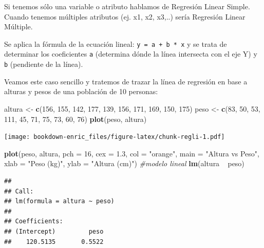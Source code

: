 \documentclass[]{book}
\newenvironment{Shaded}{\begin{snugshade}}{\end{snugshade}}
\newcommand{\KeywordTok}[1]{\textcolor[rgb]{0.13,0.29,0.53}{\textbf{{#1}}}}
\newcommand{\DataTypeTok}[1]{\textcolor[rgb]{0.13,0.29,0.53}{{#1}}}
\newcommand{\DecValTok}[1]{\textcolor[rgb]{0.00,0.00,0.81}{{#1}}}
\newcommand{\FloatTok}[1]{\textcolor[rgb]{0.00,0.00,0.81}{{#1}}}
\newcommand{\StringTok}[1]{\textcolor[rgb]{0.31,0.60,0.02}{{#1}}}
\newcommand{\CommentTok}[1]{\textcolor[rgb]{0.56,0.35,0.01}{\textit{{#1}}}}
\newcommand{\NormalTok}[1]{{#1}}
\theoremstyle{definition}
\theoremstyle{definition}
\theoremstyle{remark}
\begin{document}
Si tenemos sólo una variable o atributo hablamos de Regresión Linear
Simple. Cuando tenemos múltiples atributos (ej. x1, x2, x3,..) sería
Regresión Linear Múltiple.

Se aplica la fórmula de la ecuación lineal: \texttt{y\ =\ a\ +\ b\ *\ x}
y se trata de determinar los coeficientes \texttt{a} (determina dónde la
línea intersecta con el eje Y) y \texttt{b} (pendiente de la línea).

Veamos este caso sencillo y tratemos de trazar la línea de regresión en
base a alturas y pesos de una población de 10 personas:

\begin{Shaded}
\begin{Highlighting}[]
\NormalTok{altura <-}\StringTok{ }\KeywordTok{c}\NormalTok{(}\DecValTok{156}\NormalTok{, }\DecValTok{155}\NormalTok{, }\DecValTok{142}\NormalTok{, }\DecValTok{177}\NormalTok{, }\DecValTok{139}\NormalTok{, }\DecValTok{156}\NormalTok{, }\DecValTok{171}\NormalTok{, }\DecValTok{169}\NormalTok{, }\DecValTok{150}\NormalTok{, }\DecValTok{175}\NormalTok{)}
\NormalTok{peso <-}\StringTok{ }\KeywordTok{c}\NormalTok{(}\DecValTok{83}\NormalTok{, }\DecValTok{50}\NormalTok{, }\DecValTok{53}\NormalTok{, }\DecValTok{111}\NormalTok{, }\DecValTok{45}\NormalTok{, }\DecValTok{71}\NormalTok{, }\DecValTok{75}\NormalTok{, }\DecValTok{73}\NormalTok{, }\DecValTok{60}\NormalTok{, }\DecValTok{76}\NormalTok{)}
\KeywordTok{plot}\NormalTok{(peso, altura)}
\end{Highlighting}
\end{Shaded}

\texttt{[image: bookdown-enric\_files/figure-latex/chunk-regli-1.pdf]}

\begin{Shaded}
\begin{Highlighting}[]
\KeywordTok{plot}\NormalTok{(peso, altura, }\DataTypeTok{pch =} \DecValTok{16}\NormalTok{, }\DataTypeTok{cex =} \FloatTok{1.3}\NormalTok{, }\DataTypeTok{col =} \StringTok{"orange"}\NormalTok{, }
     \DataTypeTok{main =} \StringTok{"Altura vs Peso"}\NormalTok{, }
     \DataTypeTok{xlab =} \StringTok{"Peso (kg)"}\NormalTok{, }
     \DataTypeTok{ylab =} \StringTok{"Altura (cm)"}\NormalTok{)}
\CommentTok{#modelo lineal}
\KeywordTok{lm}\NormalTok{(altura ~}\StringTok{ }\NormalTok{peso) }
\end{Highlighting}
\end{Shaded}

\begin{verbatim}
## 
## Call:
## lm(formula = altura ~ peso)
## 
## Coefficients:
## (Intercept)         peso  
##    120.5135       0.5522
\end{verbatim}
\end{document}
